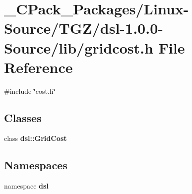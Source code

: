 \section{\_\-CPack\_\-Packages/Linux-\/Source/TGZ/dsl-\/1.0.0-\/Source/lib/gridcost.h File Reference}
\label{__CPack__Packages_2Linux-Source_2TGZ_2dsl-1_80_80-Source_2lib_2gridcost_8h}
{\ttfamily \#include \char`\"{}cost.h\char`\"{}}\par
\subsection*{Classes}
\begin{DoxyCompactItemize}
\item 
class {\bf dsl::GridCost}
\end{DoxyCompactItemize}
\subsection*{Namespaces}
\begin{DoxyCompactItemize}
\item 
namespace {\bf dsl}
\end{DoxyCompactItemize}
